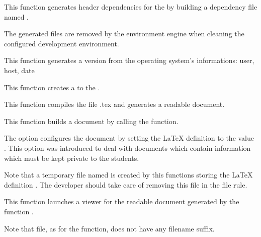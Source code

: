          {
	   This function generates header dependencies for the 
	   by building a  dependency file named
	   .

	   \-

	   The generated files  are removed by
	   the environment engine when cleaning the configured development
	   environment.
	 }

         {
	   This function generates a version  from the operating
	   system's informations: user, host, date \etc{}
	 }

         {
	   This function creates a  to the .
	 }

         {
	   This function compiles the file .tex and
	   generates a readable document.
	 }

         {
	   This function builds a document by calling the
            function.

	   \-

           The option  configures the document
	   by setting the {\LaTeX} definition  to
	   the value . This option was introduced to deal with
	   documents which contain information which must be kept private to
	   the students.

	   \-

	   Note that a temporary file named 
	   is created by this functions storing the {\LaTeX} definition
	   . The developer should take care of
	   removing this file in the   file rule.
	 }

         {
	   This function launches a viewer for the readable document
	   generated by the function .

	   \-

	   Note that file, as for the  function,
	   does not have any filename suffix.
	 }

